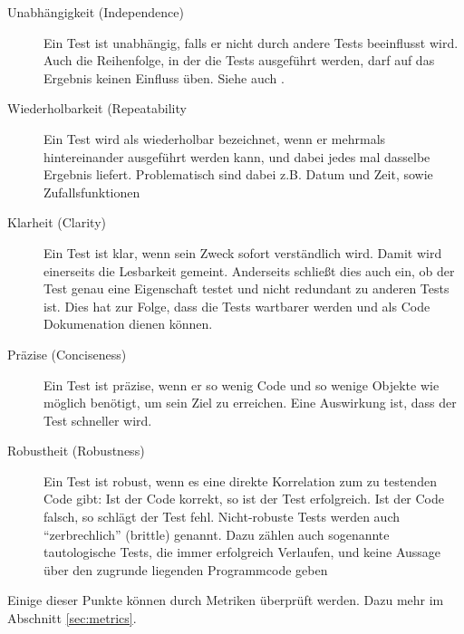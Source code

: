 \begin{description}
 \item[Unabhängigkeit (Independence)] Ein Test ist unabhängig, falls er nicht durch andere Tests beeinflusst wird. Auch die Reihenfolge, in der die Tests ausgeführt werden, darf auf das Ergebnis keinen Einfluss üben. Siehe auch \citep{beck_test_2002}.
 \item[Wiederholbarkeit (Repeatability] Ein Test wird als wiederholbar bezeichnet, wenn er mehrmals hintereinander ausgeführt werden kann, und dabei jedes mal dasselbe Ergebnis liefert. Problematisch sind dabei z.B. Datum und Zeit, sowie Zufallsfunktionen
 \item[Klarheit (Clarity)] Ein Test ist klar, wenn sein Zweck sofort verständlich wird. Damit wird einerseits die Lesbarkeit gemeint. Anderseits schließt dies auch ein, ob der Test genau eine Eigenschaft testet und nicht redundant zu anderen Tests ist. Dies hat zur Folge, dass die Tests wartbarer werden und als Code Dokumenation dienen können.
 \item[Präzise (Conciseness)] Ein Test ist präzise, wenn er so wenig Code und so wenige Objekte wie möglich benötigt, um sein Ziel zu erreichen. Eine Auswirkung ist, dass der Test schneller wird.
 \item[Robustheit (Robustness)] Ein Test ist robust, wenn es eine direkte Korrelation zum zu testenden Code gibt: Ist der Code korrekt, so ist der Test erfolgreich. Ist der Code falsch, so schlägt der Test fehl. Nicht-robuste Tests werden auch "`zerbrechlich"' (brittle) genannt. Dazu zählen auch sogenannte tautologische Tests, die immer erfolgreich Verlaufen, und keine Aussage über den zugrunde liegenden Programmcode geben
 \end{description}

Einige dieser Punkte können durch Metriken überprüft werden. Dazu mehr im Abschnitt \ref{sec:metrics}.

